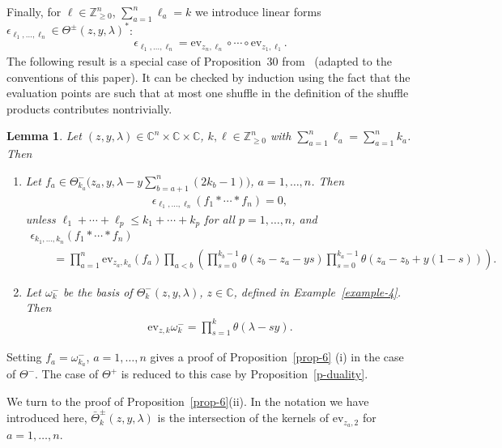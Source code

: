 \documentclass[10pt,a4paper]{amsart}
\numberwithin{equation}{section}
\newtheorem{Lemma}[Theorem]{Lemma}
\begin{document}
Finally, for $\ell\in\mathbb Z_{\geq0}^n$, $\sum\limits_{a=1}^n\ell_a=k$ we introduce linear forms $\epsilon_{\ell_1,\dots,\ell_n}\in\Theta^\pm(z,y,\lambda)^*$:
\begin{gather*}
 \epsilon_{\ell_1,\dots,\ell_n}= \mathrm{ev}_{z_n,\ell_n}\circ\cdots\circ\mathrm{ev}_{z_1,\ell_1}.
\end{gather*}
The following result is a special case of Proposition~30 from~\cite{FelderTarasovVarchenko1997} (adapted to the conventions of this paper). It can be checked by induction using the fact that the evaluation points are such that at most one shuffle in the definition of the shuffle products contributes nontrivially.
\begin{Lemma}\label{lemma-7} Let $(z,y,\lambda)\in\mathbb C^n\times \mathbb C\times\mathbb C$, $k,\ell\in\mathbb Z_{\geq0}^n$ with $\sum\limits_{a=1}^n\ell_a= \sum\limits_{a=1}^n k_a$. Then
 \begin{enumerate}\itemsep=0pt
 \item[$(i)$] Let $f_a\in\Theta^-_{k_a}\Big(z_a,y,\lambda-y\sum\limits_{b=a+1}^n(2k_b-1)\Big)$, $a=1,\dots,n$. Then
 \begin{gather*}
 \epsilon_{\ell_1,\dots,\ell_n}(f_1*\cdots*f_n)=0,
 \end{gather*}
 unless $\ell_1+\cdots+\ell_p\leq k_1+\cdots+k_p$ for all $p=1,\dots,n$, and
 \begin{gather*}
 \epsilon_{k_1,\dots,k_n} (f_1*\cdots*f_n) \\
\qquad {} =\prod_{a=1}^n\mathrm{ev}_{z_a,k_a}(f_a) \prod_{a<b}\left(\prod_{s=0}^{k_b-1}\theta(z_b-z_a-ys) \prod_{s=0}^{k_a-1}\theta(z_a-z_b+y(1-s))\right).
 \end{gather*}
 \item[$(ii)$] Let $\omega^-_k$ be the basis of $\Theta^-_k(z,y,\lambda)$, $z\in\mathbb C$, defined in Example~{\rm \ref{example-4}}. Then
 \begin{gather*}
 \mathrm{ev}_{z,k}\omega^-_k=\prod_{s=1}^k\theta(\lambda-sy).
 \end{gather*}
 \end{enumerate}
\end{Lemma}

Setting $f_a=\omega^-_{k_a}$, $a=1,\dots, n$ gives a proof of Proposition~\ref{prop-6} (i) in the case of $\Theta^-$. The case of $\Theta^+$ is reduced to this case by Proposition~\ref{p-duality}.

We turn to the proof of Proposition~\ref{prop-6}(ii). In the notation we have introduced here, $\bar\Theta^\pm_k(z,y,\lambda)$ is the intersection of the kernels of $\mathrm{ev}_{z_a,2}$ for $a=1,\dots,n$.
\end{document}
